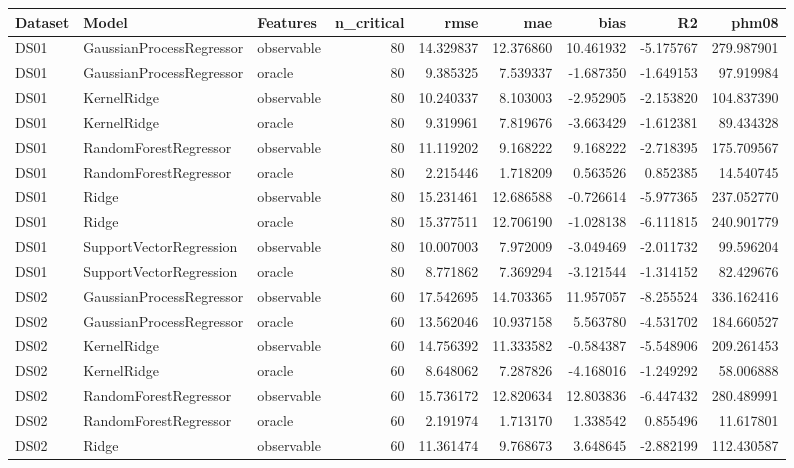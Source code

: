 \begin{tabular}{lllrrrrrr}
\toprule
Dataset & Model & Features & n\_critical & rmse & mae & bias & R2 & phm08 \\
\midrule
DS01 & GaussianProcessRegressor & observable & 80 & 14.329837 & 12.376860 & 10.461932 & -5.175767 & 279.987901 \\
DS01 & GaussianProcessRegressor & oracle & 80 & 9.385325 & 7.539337 & -1.687350 & -1.649153 & 97.919984 \\
DS01 & KernelRidge & observable & 80 & 10.240337 & 8.103003 & -2.952905 & -2.153820 & 104.837390 \\
DS01 & KernelRidge & oracle & 80 & 9.319961 & 7.819676 & -3.663429 & -1.612381 & 89.434328 \\
DS01 & RandomForestRegressor & observable & 80 & 11.119202 & 9.168222 & 9.168222 & -2.718395 & 175.709567 \\
DS01 & RandomForestRegressor & oracle & 80 & 2.215446 & 1.718209 & 0.563526 & 0.852385 & 14.540745 \\
DS01 & Ridge & observable & 80 & 15.231461 & 12.686588 & -0.726614 & -5.977365 & 237.052770 \\
DS01 & Ridge & oracle & 80 & 15.377511 & 12.706190 & -1.028138 & -6.111815 & 240.901779 \\
DS01 & SupportVectorRegression & observable & 80 & 10.007003 & 7.972009 & -3.049469 & -2.011732 & 99.596204 \\
DS01 & SupportVectorRegression & oracle & 80 & 8.771862 & 7.369294 & -3.121544 & -1.314152 & 82.429676 \\
DS02 & GaussianProcessRegressor & observable & 60 & 17.542695 & 14.703365 & 11.957057 & -8.255524 & 336.162416 \\
DS02 & GaussianProcessRegressor & oracle & 60 & 13.562046 & 10.937158 & 5.563780 & -4.531702 & 184.660527 \\
DS02 & KernelRidge & observable & 60 & 14.756392 & 11.333582 & -0.584387 & -5.548906 & 209.261453 \\
DS02 & KernelRidge & oracle & 60 & 8.648062 & 7.287826 & -4.168016 & -1.249292 & 58.006888 \\
DS02 & RandomForestRegressor & observable & 60 & 15.736172 & 12.820634 & 12.803836 & -6.447432 & 280.489991 \\
DS02 & RandomForestRegressor & oracle & 60 & 2.191974 & 1.713170 & 1.338542 & 0.855496 & 11.617801 \\
DS02 & Ridge & observable & 60 & 11.361474 & 9.768673 & 3.648645 & -2.882199 & 112.430587 \\

\end{tabular}

